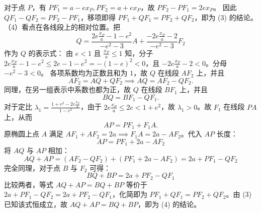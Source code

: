 \begin{solution}
对于点 $P$，有 $PF_1 = a - ex_P, PF_2 = a + ex_P$，故 $PF_2 - PF_1 = 2ex_P$。
因此 $QF_1 - QF_2 = PF_2 - PF_1$，移项即得 $PF_1 + QF_1 = PF_2 + QF_2$，即为 (3) 的结论。\\
（4）看点在各线段上的相对位置。把
$$Q = \frac{2e\frac{x_P}{a} - 1 - e^2}{-e^2-3} A + \frac{-2e\frac{x_P}{a} - 2}{-e^2-3} F_2$$
作为 $Q$ 的表示式：
由 $e < 1$ 且 $\frac{x_P}{a} \le 1$ 知，分子 $2e\frac{x_P}{a} - 1 - e^2 \le 2e - 1 - e^2 = -(1-e)^2 < 0$，且 $-2e\frac{x_P}{a} - 2 < 0$。分母 $-e^2-3 < 0$。
各项系数均为正数且和为 $1$，故 $Q$ 在线段 $AF_2$ 上，并且
$$AF_2 = AQ + QF_2 \implies AQ = AF_2 - QF_2.$$
同理，在另一组表示中系数也都为正，故 $Q$ 在线段 $BF_1$ 上，并且
$$BQ = BF_1 - QF_1.$$
对于定比 $\lambda_1 = \frac{1+e^2 - 2e\frac{x_P}{a}}{1-e^2}$，由于 $2e\frac{x_P}{a} \le 2e < 1+e^2$，故 $\lambda_1 > 0$。故 $F_1$ 在线段 $PA$ 上，从而
$$AP = PF_1 + F_1A.$$
原椭圆上点 $A$ 满足 $AF_1 + AF_2 = 2a \implies F_1A = 2a - AF_2$。代入 $AP$ 长度：
$$AP = PF_1 + 2a - AF_2$$
将 $AQ$ 与 $AP$ 相加：
$$AQ + AP = (AF_2 - QF_2) + (PF_1 + 2a - AF_2) = 2a + PF_1 - QF_2$$
完全同理，对于点 $B$ 与 $F_2$ 可得：
$$BQ + BP = 2a + PF_2 - QF_1$$
比较两者，等式 $AQ + AP = BQ + BP$ 等价于 $2a + PF_1 - QF_2 = 2a + PF_2 - QF_1$，化简即为 $PF_1 + QF_1 = PF_2 + QF_2$。由 (3) 已知该式恒成立，故 $AQ + AP = BQ + BP$，即为 (4) 的结论。
\end{solution}

